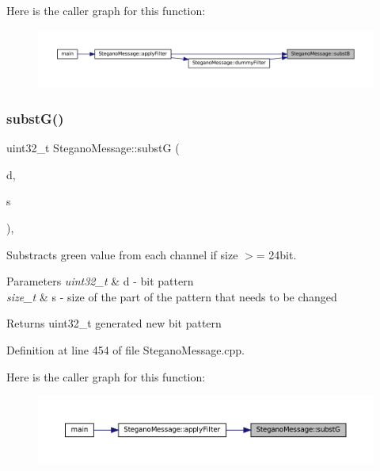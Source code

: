 Here is the caller graph for this function\+:\nopagebreak
\begin{figure}[H]
\begin{center}
\leavevmode
\includegraphics[width=350pt]{classSteganoMessage_a7eb6fd157c777b2947603d018610ad0f_icgraph}
\end{center}
\end{figure}
\mbox{\label{classSteganoMessage_a4222a1b128b9b188c30ea99180f74111}} 
\subsubsection{\texorpdfstring{substG()}{substG()}}
{\footnotesize\ttfamily uint32\+\_\+t Stegano\+Message\+::substG (\begin{DoxyParamCaption}\item[{uint32\+\_\+t}]{d,  }\item[{size\+\_\+t}]{s }\end{DoxyParamCaption})\hspace{0.3cm}{\ttfamily [static]}, {\ttfamily [private]}}



Substracts green value from each channel if size $>$= 24bit. 


\begin{DoxyParams}{Parameters}
{\em uint32\+\_\+t} & d -\/ bit pattern \\
\hline
{\em size\+\_\+t} & s -\/ size of the part of the pattern that needs to be changed \\
\hline
\end{DoxyParams}
\begin{DoxyReturn}{Returns}
uint32\+\_\+t generated new bit pattern 
\end{DoxyReturn}


Definition at line 454 of file Stegano\+Message.\+cpp.

Here is the caller graph for this function\+:\nopagebreak
\begin{figure}[H]
\begin{center}
\leavevmode
\includegraphics[width=350pt]{classSteganoMessage_a4222a1b128b9b188c30ea99180f74111_icgraph}
\end{center}
\end{figure}
\mbox{\label{classSteganoMessage_a021f0126410e739bc89ac2458198ad0c}} 
